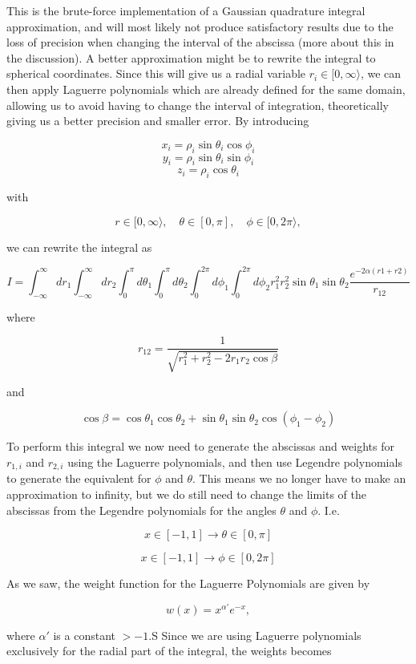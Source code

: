 \documentclass[a4paper,10pt,english]{article}
\begin{document}
This is the brute-force implementation of a Gaussian quadrature integral approximation, and will most likely not produce satisfactory results due to the loss of precision when changing the interval of the abscissa (more about this in the discussion). A better approximation might be to rewrite the integral to spherical coordinates. Since this will give us a radial variable $r_i \in [0, \infty\rangle$, we can then apply Laguerre polynomials which are already defined for the same domain, allowing us to avoid having to change the interval of integration, theoretically giving us a better precision and smaller error. By introducing

$$x_i = \rho_i \sin{\theta_i}\cos{\phi_i}$$
$$y_i = \rho_i \sin{\theta_i}\sin{\phi_i}$$
$$z_i = \rho_i \cos{\theta_i}$$

with 

$$r \in [0, \infty\rangle, \quad \theta \in [0, \pi], \quad \phi \in [0, 2\pi \rangle,$$

we can rewrite the integral as

$$I = \int_{-\infty}^\infty dr_1 \int_{-\infty}^\infty dr_2 \int_0^\pi d\theta_1 \int_0^\pi d\theta_2 \int_0^{2\pi} d\phi_1 \int_0^{2\pi} d\phi_2 r_1^2 r_2^2 \sin{\theta_1} \sin{\theta_2} \frac{e^{-2 \alpha (r1 + r2)}}{r_{12}}$$

where

$$r_{12} = \frac{1}{\sqrt{r_1^2 + r_2^2 - 2r_1 r_2 \cos{\beta}}}$$

and 

$$\cos{\beta} = \cos{\theta_1}\cos{\theta_2} + \sin{\theta_1}\sin{\theta_2}\cos{(\phi_1 - \phi_2)}$$

To perform this integral we now need to generate the abscissas and weights for $r_{1,i}$ and $r_{2,i}$ using the Laguerre polynomials, and then use Legendre polynomials to generate the equivalent for $\phi$ and $\theta$. This means we no longer have to make an approximation to infinity, but we do still need to change the limits of the abscissas from the Legendre polynomials for the angles $\theta$ and $\phi$. I.e.

$$x \in [-1, 1] \rightarrow \theta \in [0, \pi] $$

$$x \in [-1, 1] \rightarrow \phi \in [0, 2 \pi]$$

As we saw, the weight function for the Laguerre Polynomials are given by

$$w(x) = x^{\alpha'} e^{-x},$$

where $\alpha'$ is a constant $> -1$.S Since we are using Laguerre polynomials exclusively for the radial part of the integral, the weights becomes
\end{document}
